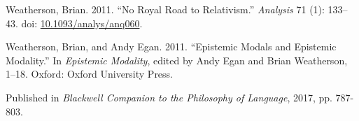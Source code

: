 \documentclass[
  10pt,
  letterpaper,
  DIV=11,
  numbers=noendperiod,
  twoside]{scrartcl}
\newlength{\cslhangindent}
\newenvironment{CSLReferences}[2] %
 {\begin{list}{}{%
  \setlength{\itemindent}{0pt}
  \setlength{\leftmargin}{0pt}
  \setlength{\parsep}{0pt}
  \ifodd #1
   \setlength{\leftmargin}{\cslhangindent}
   \setlength{\itemindent}{-1\cslhangindent}
  \fi
  \setlength{\itemsep}{#2\baselineskip}}}
 {\end{list}}
\begin{document}
\begin{CSLReferences}{1}{0}
Weatherson, Brian. 2011. {``No Royal Road to Relativism.''}
\emph{Analysis} 71 (1): 133--43. doi:
\href{https://doi.org/10.1093/analys/anq060}{10.1093/analys/anq060}.

Weatherson, Brian, and Andy Egan. 2011. {``Epistemic Modals and
Epistemic Modality.''} In \emph{Epistemic Modality}, edited by Andy Egan
and Brian Weatherson, 1--18. Oxford: Oxford University Press.

\end{CSLReferences}



\noindent Published in\emph{
Blackwell Companion to the Philosophy of Language}, 2017, pp. 787-803.
\end{document}
